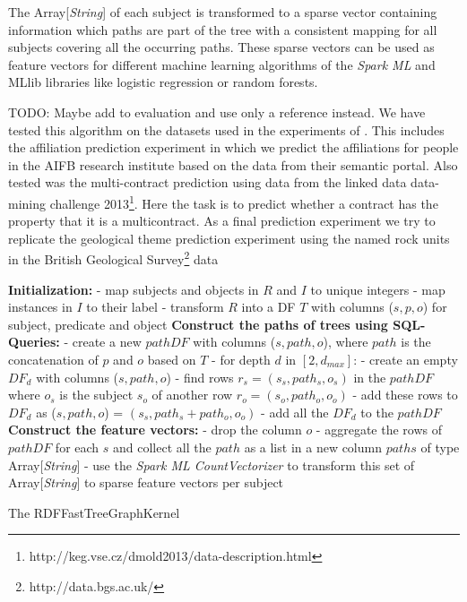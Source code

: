 \documentclass{easychair}
\begin{document}
The Array[\textit{String}] of each subject is transformed to a sparse vector containing information which paths are part of the tree with a consistent mapping for all subjects covering all the occurring paths. These sparse vectors can be used as feature vectors for different machine learning algorithms of the \textit{Spark ML} and {MLlib} libraries like logistic regression or random forests.

TODO: Maybe add to evaluation and use only a reference instead.
We have tested this algorithm on the datasets used in the experiments of \cite{FGK}. This includes the affiliation prediction experiment in which we predict the affiliations for people in the AIFB research institute based on the data from their semantic portal. Also tested was the multi-contract prediction using data from the linked data data-mining challenge 2013\footnote{http://keg.vse.cz/dmold2013/data-description.html}. Here the task is to predict whether a contract has the property that it is a multicontract. As a final prediction experiment we try to replicate the geological theme prediction experiment using the named rock units in the British Geological Survey\footnote{http://data.bgs.ac.uk/} data

\begin{algorithm}
 \label{alg:FTGK}
 \;
 \textbf{Initialization:}\; \Indp
 - map subjects and objects in $R$ and $I$ to unique integers\;
 - map instances in $I$ to their label\;
 - transform $R$ into a DF $T$ with columns ($s,p,o$) for subject, predicate and object\; \Indm
\; 
\textbf{Construct the paths of trees using SQL-Queries:}\; \Indp
- create a new $pathDF$ with columns ($s,path,o$), where $path$ is the concatenation of $p$ and $o$ based on $T$\;
- for depth $d$ in $[2,d_{max}]$:\; \Indp
- create an empty $DF_d$ with columns ($s,path,o$)\;
- find rows $r_s = (s_s,path_s,o_s)$ in the $pathDF$ where $o_s$ is the subject $s_o$ of another row $r_o=(s_o,path_o,o_o)$\;
- add these rows to $DF_d$ as ($s,path,o$) = $(s_s,path_s+path_o,o_o)$\; \Indm
- add all the $DF_d$ to the $pathDF$\; \Indm
 \;
 \textbf{Construct the feature vectors:}\; \Indp
 - drop the column $o$\;
 - aggregate the rows of $pathDF$ for each $s$ and collect all the $path$ as a list in a new column $paths$ of type Array[\textit{String}]\;
 - use the \textit{Spark ML CountVectorizer} to transform this set of Array[\textit{String}] to sparse feature vectors per subject\;
 \;
\caption{The RDFFastTreeGraphKernel}
\end{algorithm}
\end{document}

